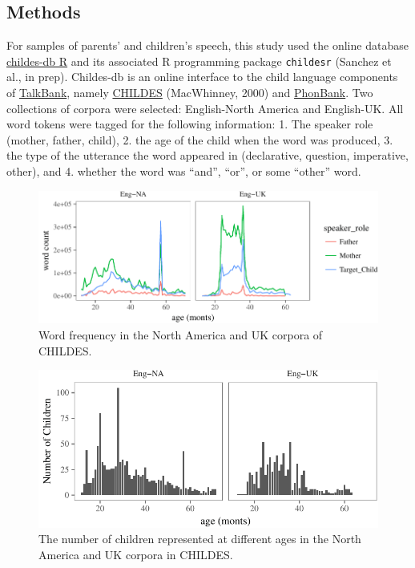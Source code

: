 \documentclass[oneside]{report}
\theoremstyle{definition}
\theoremstyle{definition}
\theoremstyle{definition}
\theoremstyle{remark}
\begin{document}
\subsection{Methods}\label{study1methods}

For samples of parents' and children's speech, this study used the
online database \href{childes-db.stanford.edu}{childes-db R} and its
associated R programming package \texttt{childesr} (Sanchez et al., in
prep). Childes-db is an online interface to the child language
components of \href{https://talkbank.org/}{TalkBank}, namely
\href{https://childes.talkbank.org/}{CHILDES} (MacWhinney, 2000) and
\href{https://phonbank.talkbank.org/}{PhonBank}. Two collections of
corpora were selected: English-North America and English-UK. All word
tokens were tagged for the following information: 1. The speaker role
(mother, father, child), 2. the age of the child when the word was
produced, 3. the type of the utterance the word appeared in
(declarative, question, imperative, other), and 4. whether the word was
``and'', ``or'', or some ``other'' word.
\begin{figure}[tb]

{\centering \includegraphics{figs/corpusDensityPlot-1} 

}

\caption{Word frequency in the North America and UK corpora of CHILDES.}\label{fig:corpusDensityPlot}
\end{figure}
\begin{figure}[tb]

{\centering \includegraphics{figs/childDensityPlot-1} 

}

\caption{The number of children represented at different ages in the North America and UK corpora in CHILDES.}\label{fig:childDensityPlot}
\end{figure}
\end{document}
